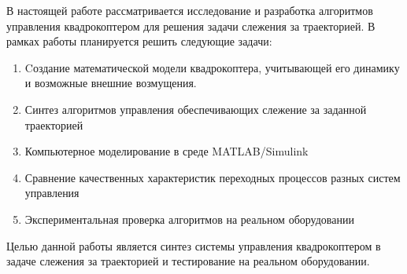В настоящей работе рассматривается исследование и разработка 
алгоритмов управления квадрокоптером для решения задачи слежения 
за траекторией. В рамках работы планируется решить следующие задачи:

\begin{enumerate}
    \item Cоздание математической модели квадрокоптера, учитывающей его динамику и возможные 
    внешние возмущения.
    \item Синтез алгоритмов управления обеспечивающих слежение за заданной траекторией
    \item Компьютерное моделирование в среде MATLAB/Simulink
    \item Сравнение качественных характеристик переходных процессов разных систем управления
    \item Экспериментальная проверка алгоритмов на реальном 
    оборудовании
\end{enumerate}



Целью данной работы является синтез системы управления 
квадрокоптером в задаче слежения за траекторией и тестирование на реальном оборудовании.





\endinput
